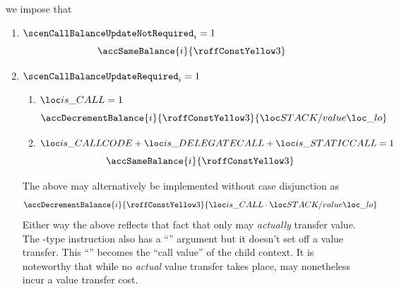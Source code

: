 \item[\underline{Setting the \callerName{} balance operation on account-row $n^°(i + \callFirstCallerAccountRowOffset)$:}]
	we impose that
	\begin{enumerate}
		\item \If $\scenCallBalanceUpdateNotRequired _{i} = 1$ \Then
			\[
				\accSameBalance
				{i}{\callFirstCallerAccountRowOffset}
			\]
		\item \If $\scenCallBalanceUpdateRequired _{i} = 1$ \Then
			\begin{enumerate}
				\item \If $\locIsCall = 1$ \Then
					\[
						\accDecrementBalance
						{i}{\callFirstCallerAccountRowOffset}{\locStackValueLo}
					\]
				\item \If $\locIsCallcode + \locIsDelegatecall + \locIsStaticcall = 1$ \Then
					\[
						\accSameBalance
						{i}{\callFirstCallerAccountRowOffset}
					\]
			\end{enumerate}
			\saNote{} \label{hub: instruction handling: call: generalities: first account rows: value transfer subtleties}
			The above may alternatively be implemented without case disjunction as
			\[
				\accDecrementBalance
				{i}{\callFirstCallerAccountRowOffset}{\locIsCall \cdot \locStackValueLo}
			\]
			Either way the above reflects that fact that only  may \emph{actually} transfer value.
			The -type instruction  also has a ``\locStackValue'' argument but it doesn't set off a value transfer.
			This ``\locStackValue'' becomes the ``call value'' of the child context.
			It is noteworthy that while no \emph{actual} value transfer takes place,
			 may nonetheless incur a value transfer cost.
	\end{enumerate}

